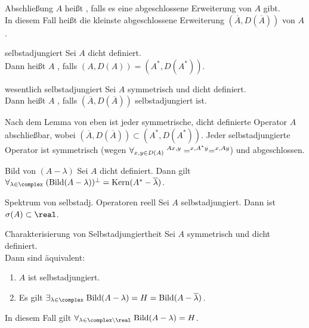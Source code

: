 \begin{Def}{Abschließung}
    $A$ heißt , falls es eine abgeschlossene Erweiterung von $A$ gibt.\\
    In diesem Fall heißt die kleinste abgeschlossene Erweiterung $(\overline{A}, D(\overline{A}))$
     von $A$.
\end{Def}

\begin{Def}{selbstadjungiert}
    Sei $A$ dicht definiert.\\
    Dann heißt $A$ , falls $(A, D(A)) = (A^\ast, D(A^\ast))$.
\end{Def}

\begin{Def}{wesentlich selbstadjungiert}
    Sei $A$ symmetrisch und dicht definiert.\\
    Dann heißt $A$ , falls
    $(\overline{A}, D(\overline{A}))$ selbstadjungiert ist.
\end{Def}

\begin{Bem}
    Nach dem Lemma von eben ist jeder symmetrische, dicht definierte Operator $A$ abschließbar,
    wobei $(\overline{A}, D(\overline{A})) \subset (A^\ast, D(A^\ast))$.
    Jeder selbstadjungierte Operator ist symmetrisch
    (wegen $\forall_{x, y \in D(A)}\; \sp{Ax, y} = \sp{x, A^\ast y} = \sp{x, Ay}$)
    und abgeschlossen.
\end{Bem}

\linie

\begin{Lemma}{Bild von $(A - \lambda)$}
    Sei $A$ dicht definiert.
    Dann gilt $\forall_{\lambda \in \complex}\;
    (\Bild(A - \lambda))^{\orth} = \Kern(A^\ast - \overline{\lambda})$.
\end{Lemma}

\begin{Satz}{Spektrum von selbstadj. Operatoren reell}
    Sei $A$ selbstadjungiert.
    Dann ist $\sigma(A) \subset \real$.
\end{Satz}

\begin{Satz}{Charakterisierung von Selbstadjungiertheit}
    Sei $A$ symmetrisch und dicht definiert.\\
    Dann sind äquivalent:
    \begin{enumerate}
        \item
        $A$ ist selbstadjungiert.

        \item
        Es gilt
        $\exists_{\lambda \in \complex}\; \Bild(A - \lambda) = H = \Bild(A - \overline{\lambda})$.
    \end{enumerate}
    In diesem Fall gilt $\forall_{\lambda \in \complex \setminus \real}\; \Bild(A - \lambda) = H$.
\end{Satz}

